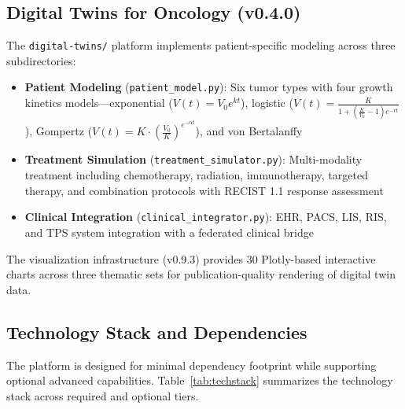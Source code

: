 \documentclass[10pt]{article}
\begin{document}
\subsection{Digital Twins for Oncology (v0.4.0)}

The \texttt{digital-twins/} platform implements patient-specific modeling across three subdirectories:
\begin{itemize}
  \item \textbf{Patient Modeling} (\texttt{patient\_model.py}): Six tumor types with four growth kinetics models---exponential ($V(t) = V_0 e^{kt}$), logistic ($V(t) = \frac{K}{1 + (\frac{K}{V_0} - 1)e^{-rt}}$), Gompertz ($V(t) = K \cdot (\frac{V_0}{K})^{e^{-\alpha t}}$), and von Bertalanffy
  \item \textbf{Treatment Simulation} (\texttt{treatment\_simulator.py}): Multi-modality treatment including chemotherapy, radiation, immunotherapy, targeted therapy, and combination protocols with RECIST 1.1 response assessment~\cite{eisenhauer2009recist}
  \item \textbf{Clinical Integration} (\texttt{clinical\_integrator.py}): EHR, PACS, LIS, RIS, and TPS system integration with a federated clinical bridge
\end{itemize}

The visualization infrastructure (v0.9.3) provides 30 Plotly-based interactive charts across three thematic sets for publication-quality rendering of digital twin data.

\subsection{Technology Stack and Dependencies}

The platform is designed for minimal dependency footprint while supporting optional advanced capabilities. Table~\ref{tab:techstack} summarizes the technology stack across required and optional tiers.
\end{document}
